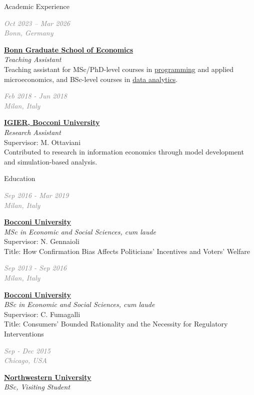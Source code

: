 \documentclass{resume} %
\newcommand{\cventry}[2]{%
  \noindent
  \begin{minipage}[t]{0.24\linewidth}
    \raggedright\textcolor{gray}{\emph{#1}}
  \end{minipage}%
  \hspace{0.02\linewidth}%
  \begin{minipage}[t]{0.73\linewidth}
    \raggedright #2
  \end{minipage}
  \par\medskip
}
\newcommand{\cvtitle}[1]{\textbf{#1}}
\newcommand{\cvrole}[1]{\emph{#1}}
\newcommand{\cvdesc}[1]{{\small\color{gray}#1}}
\begin{document}
\begin{rSection}{Academic Experience}
        
        \cventry{Oct 2023 -- Mar 2026 \\ Bonn, Germany}%
                {\cvtitle{\href{https://www.econ.uni-bonn.de/bgse/en}{Bonn Graduate School of Economics}} \\
                {\cvrole{Teaching Assistant}} \\[2pt]
                {\cvdesc{Teaching assistant for MSc/PhD-level courses in \href{https://www.wiwi.uni-bonn.de/gaudecker/_static/epp_bonn/landing-page.html}{programming} and applied microeconomics, and BSc-level courses in \href{https://www.wiwi.uni-bonn.de/gaudecker/_static/applied-data-analytics/landing-page.html\#}{data analytics}.
                }}}
                
        \cventry{Feb 2018 - Jun 2018 \\ Milan, Italy}%
                {\cvtitle{\href{https://www.igier.unibocconi.it}{IGIER, Bocconi University}} \\
                {\cvrole{Research Assistant}} \\[2pt]
                {\cvdesc{Supervisor: M. Ottaviani \\ Contributed to research in information economics through model development and simulation-based analysis.}}}
        
\end{rSection}


\begin{rSection}{Education}

\cventry{Sep 2016 - Mar 2019 \\ Milan, Italy}%
        {\cvtitle{\href{https://www.unibocconi.it/en}{Bocconi University}} \\
        {\cvrole{MSc in Economic and Social Sciences, cum laude}} \\[2pt]
        {\cvdesc{Supervisor: N. Gennaioli \\
        Title: How Confirmation Bias Affects Politicians' Incentives and Voters' Welfare}}}

\cventry{Sep 2013 - Sep 2016 \\ Milan, Italy}%
        {\cvtitle{\href{https://www.unibocconi.it/en}{Bocconi University}} \\
        {\cvrole{BSc in Economic and Social Sciences, cum laude}} \\[2pt]
        {\cvdesc{Supervisor: C. Fumagalli\\
        Title: Consumers' Bounded Rationality and the Necessity for Regulatory Interventions}}}
        
\cventry{Sep - Dec 2015 \\ Chicago, USA}%
        {\cvtitle{\href{https://www.northwestern.edu}{Northwestern University}} \\[2pt]
        {\cvrole{BSc, Visiting Student}}}

\end{rSection}
\end{document}
